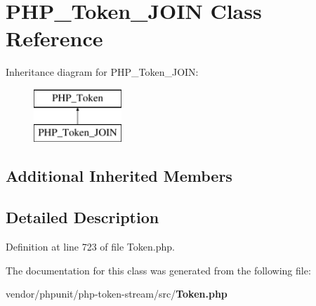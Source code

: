 \section{P\+H\+P\+\_\+\+Token\+\_\+\+J\+O\+I\+N Class Reference}
\label{class_p_h_p___token___j_o_i_n}
Inheritance diagram for P\+H\+P\+\_\+\+Token\+\_\+\+J\+O\+I\+N\+:\begin{figure}[H]
\begin{center}
\leavevmode
\includegraphics[height=2.000000cm]{class_p_h_p___token___j_o_i_n}
\end{center}
\end{figure}
\subsection*{Additional Inherited Members}


\subsection{Detailed Description}


Definition at line 723 of file Token.\+php.



The documentation for this class was generated from the following file\+:\begin{DoxyCompactItemize}
\item 
vendor/phpunit/php-\/token-\/stream/src/{\bf Token.\+php}\end{DoxyCompactItemize}
